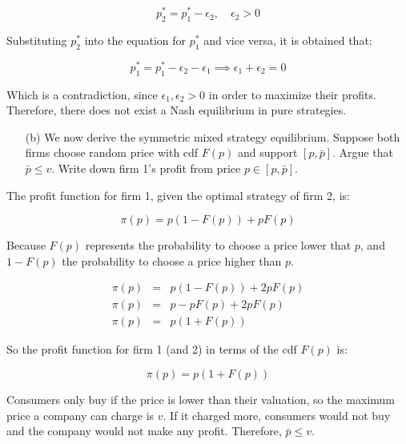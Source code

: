 \begin{equation*}
    p_2^* = p_1^* - \epsilon_2, \quad \epsilon_2 > 0
\end{equation*}

Substituting $p_2^*$ into the equation for $p_1^*$ and vice versa, it is obtained that:

\begin{equation*}
    p_1^* = p_1^* - \epsilon_2 - \epsilon_1 \implies \epsilon_1 + \epsilon_2 = 0
\end{equation*}

\begin{myanswerbox}
    Which is a contradiction, since $\epsilon_1, \epsilon_2 > 0$ in order to maximize their profits. Therefore, there does not exist a Nash equilibrium in pure strategies.
\end{myanswerbox}


\begin{tcolorbox}
    \begin{enumerate}
        \item[(b)] We now derive the symmetric mixed strategy equilibrium. Suppose both firms choose random price with cdf $F(p)$ and support $[p,\bar{p}]$. Argue that $\bar{p} \leq v$. Write down firm 1's profit from price $p \in [p,\bar{p}]$.
    \end{enumerate}
\end{tcolorbox}

The profit function for firm 1, given the optimal strategy of firm 2, is:

\begin{equation*}
    \pi(p) = p (1 - F(p)) + p F(p)
\end{equation*}

Because $F(p)$ represents the probability to choose a price lower that $p$, and $1 - F(p)$ the probability to choose a price higher than $p$.

\begin{eqnarray*}
    \pi(p) &=& p (1 - F(p)) + 2pF(p)\\
    \pi(p) &=& p - pF(p) + 2pF(p)\\
    \pi(p) &=& p (1 + F(p))
\end{eqnarray*}

\begin{myanswerbox}
    So the profit function for firm 1 (and 2) in terms of the cdf $F(p)$ is:

    \begin{equation*}
        \pi(p) = p \left(1 +  F(p) \right)
    \end{equation*}

    Consumers only buy if the price is lower than their valuation, so the maximum price a company can charge is \( v \). If it charged more, consumers would not buy and the company would not make any profit. Therefore, \( \bar{p} \leq v \).
\end{myanswerbox}

